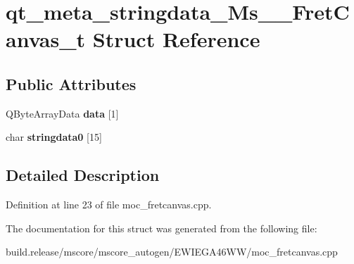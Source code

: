 \hypertarget{structqt__meta__stringdata___ms_____fret_canvas__t}{}\section{qt\+\_\+meta\+\_\+stringdata\+\_\+\+Ms\+\_\+\+\_\+\+Fret\+Canvas\+\_\+t Struct Reference}
\label{structqt__meta__stringdata___ms_____fret_canvas__t}
\subsection*{Public Attributes}
\begin{DoxyCompactItemize}
\item 
\mbox{\label{structqt__meta__stringdata___ms_____fret_canvas__t_ac71177053244d41ae805459f316a4a95}} 
Q\+Byte\+Array\+Data {\bfseries data} \mbox{[}1\mbox{]}
\item 
\mbox{\label{structqt__meta__stringdata___ms_____fret_canvas__t_a4573caa85a4772594119610951fe2ae7}} 
char {\bfseries stringdata0} \mbox{[}15\mbox{]}
\end{DoxyCompactItemize}


\subsection{Detailed Description}


Definition at line 23 of file moc\+\_\+fretcanvas.\+cpp.



The documentation for this struct was generated from the following file\+:\begin{DoxyCompactItemize}
\item 
build.\+release/mscore/mscore\+\_\+autogen/\+E\+W\+I\+E\+G\+A46\+W\+W/moc\+\_\+fretcanvas.\+cpp\end{DoxyCompactItemize}
